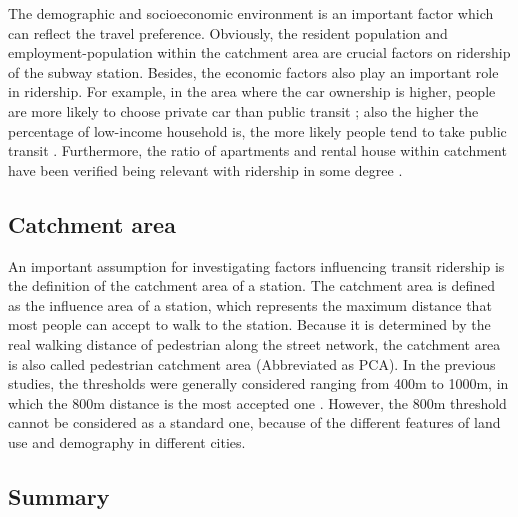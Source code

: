 The demographic and socioeconomic environment is an important factor which can reflect the travel preference. Obviously, the resident population and employment-population within the catchment area are crucial factors on ridership of the subway station. Besides, the economic factors also play an important role in ridership. For example, in the area where the car ownership is higher, people are more likely to choose private car than public transit \cite{chiou2015factors,zhao2005transit}; also the higher the percentage of low-income household is, the more likely people tend to take public transit \cite{thompson2012really}. Furthermore, the ratio of apartments and rental house within catchment have been verified being relevant with ridership in some degree \cite{jun2015land}.

\subsection{Catchment area}
An important assumption for investigating factors influencing transit ridership is the definition of the catchment area of a station. The catchment area is defined as the influence area of a station, which represents the maximum distance that most people can accept to walk to the station. Because it is determined by the real walking distance of pedestrian along the street network, the catchment area is also called pedestrian catchment area (Abbreviated as PCA). In the previous studies, the thresholds were generally considered ranging from 400m to 1000m, in which the 800m distance is the most accepted one \cite{alshalalfah2007case,guerra2012half,keijer2000people,murray1998public,o1996walking,zhao2003forecasting}. However, the 800m threshold cannot be considered as a standard one, because of the different features of land use and demography in different cities.



\subsection{Summary}

